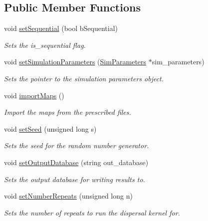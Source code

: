 \subsection*{Public Member Functions}
\begin{DoxyCompactItemize}
\item 
void \hyperlink{class_simulate_dispersal_a3da09319132db8c7ad035290be6590ef}{set\+Sequential} (bool b\+Sequential)
\begin{DoxyCompactList}\small\item\em Sets the is\+\_\+sequential flag. \end{DoxyCompactList}\item 
void \hyperlink{class_simulate_dispersal_a777d7cab80b8543647970d6d64b797a9}{set\+Simulation\+Parameters} (\hyperlink{struct_sim_parameters}{Sim\+Parameters} $\ast$sim\+\_\+parameters)
\begin{DoxyCompactList}\small\item\em Sets the pointer to the simulation parameters object. \end{DoxyCompactList}\item 
void \hyperlink{class_simulate_dispersal_a275eef6872de493273fc047467935d7b}{import\+Maps} ()
\begin{DoxyCompactList}\small\item\em Import the maps from the prescribed files. \end{DoxyCompactList}\item 
void \hyperlink{class_simulate_dispersal_a46f2cd557ac9b21c107eac75e7c916af}{set\+Seed} (unsigned long s)
\begin{DoxyCompactList}\small\item\em Sets the seed for the random number generator. \end{DoxyCompactList}\item 
void \hyperlink{class_simulate_dispersal_acae5067045d5989df6d7dce80bcfe276}{set\+Output\+Database} (string out\+\_\+database)
\begin{DoxyCompactList}\small\item\em Sets the output database for writing results to. \end{DoxyCompactList}\item 
void \hyperlink{class_simulate_dispersal_a29c7cf41d8b5610109d61f302fb32e73}{set\+Number\+Repeats} (unsigned long n)
\begin{DoxyCompactList}\small\item\em Sets the number of repeats to run the dispersal kernel for. \end{DoxyCompactList}\item 

\end{DoxyCompactItemize}
